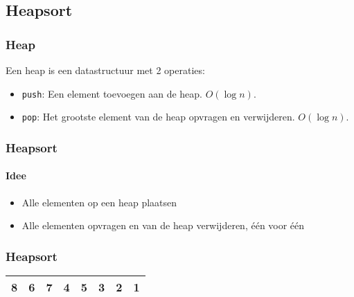 \subsection[Heap]{Heapsort}

\begin{frame}
	\frametitle{Heap}
	Een heap is een datastructuur met 2 operaties:
	\begin{itemize}
		\item \texttt{push}: Een element toevoegen aan de heap. $O(\log n)$.
		\item \texttt{pop}: Het grootste element van de heap opvragen en verwijderen. $O(\log n)$.
	\end{itemize}
\end{frame}

\begin{frame}
\frametitle{Heapsort}
\framesubtitle{Idee}
\begin{itemize}
\item Alle elementen op een heap plaatsen
\item Alle elementen opvragen en van de heap verwijderen, één voor één
\end{itemize}
\end{frame}

\begin{frame}
\frametitle{Heapsort}
\begin{table}
\begin{tabular}{| c | c | c | c | c | c | c | c |}
\hline
8 & 6 & 7 & 4 & 5 & 3 & 2 & 1 \\ 
\hline
\end{tabular}
\end{table}

\end{frame}

